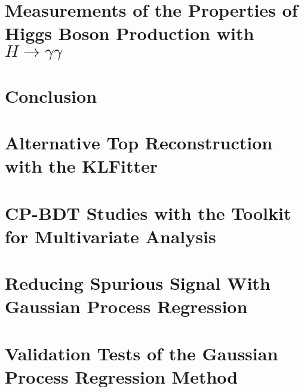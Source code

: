 \documentclass[thesis,openany]{./tex/thesis-umich}
\begin{document}
\chapter{Measurements of the Properties of Higgs Boson Production with $H \rightarrow \gamma \gamma$} \label{chap:couplings_chapter}
	 

\chapter{Conclusion} \label{chap:conclusion}
	 




\appendix

\chapter{Alternative Top Reconstruction with the KLFitter} \label{app:KLFitter}
	

\chapter{CP-BDT Studies with the Toolkit for Multivariate Analysis} \label{app:TMVABDT}
	

\chapter{Reducing Spurious Signal With Gaussian Process Regression} \label{app:GPR}
	

\chapter{Validation Tests of the Gaussian Process Regression Method} \label{app:GPRValid}
	




\end{document}
